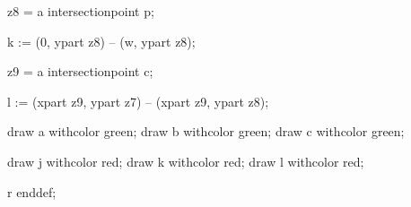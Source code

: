 			z8 = a intersectionpoint p; %

			k := (0, ypart z8) -- (w, ypart z8);

			z9 = a intersectionpoint c; %

			l := (xpart z9, ypart z7) -- (xpart z9, ypart z8);

			draw a withcolor green;
			draw b withcolor green;
			draw c withcolor green;

			draw j withcolor red; %
			draw k withcolor red; %
			draw l withcolor red; %


			r
		enddef;
	\stopMPdefinitions

\stopenvironment

